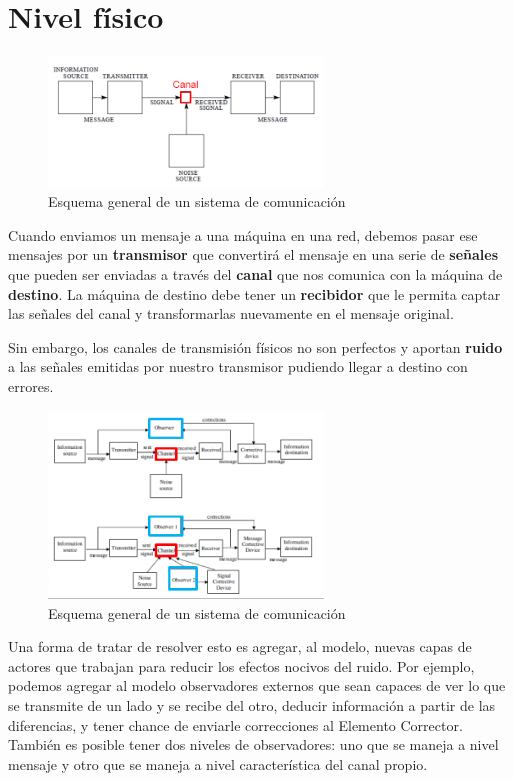 \documentclass[10pt,a4paper]{article}
\begin{document}
\newpage
\section{Nivel físico}
\begin{figure}[H]
	\centering
	\includegraphics[width=0.65\textwidth
]{images/sistema-comunicacion.png}
	\caption[Esquema general de un sistema de comunicación]{Esquema general de un sistema de comunicación}
	\label{fig:sistema-comunicacion}
\end{figure}
Cuando enviamos un mensaje a una máquina en una red, debemos pasar ese mensajes por un \textbf{transmisor} que convertirá el mensaje en una serie de \textbf{señales} que pueden ser enviadas a través del \textbf{canal} que nos comunica con la máquina de \textbf{destino}. La máquina de destino debe tener un \textbf{recibidor} que le permita captar las señales del canal y transformarlas nuevamente en el mensaje original.


Sin embargo, los canales de transmisión físicos no son perfectos y aportan \textbf{ruido} a las señales emitidas por nuestro transmisor pudiendo llegar a destino con errores.

\begin{figure}[H]
	\centering
	\includegraphics[width=0.65\textwidth
]{images/sistema-comunicacion-correccion.png}
	\caption[Esquema general de un sistema de comunicación]{Esquema general de un sistema de comunicación}
	\label{fig:sistema-comunicacion-correccion}
\end{figure}
Una forma de tratar de resolver esto es agregar, al modelo, nuevas capas de actores que trabajan para reducir los efectos nocivos del ruido. Por ejemplo, podemos agregar al modelo observadores externos que sean capaces de ver lo que se transmite de un lado y se recibe del otro, deducir información a partir de las diferencias, y tener chance de enviarle
correcciones al Elemento Corrector. También es posible tener dos niveles de observadores:
uno que se maneja a nivel mensaje y otro que se maneja a nivel característica del canal
propio.
\end{document}
